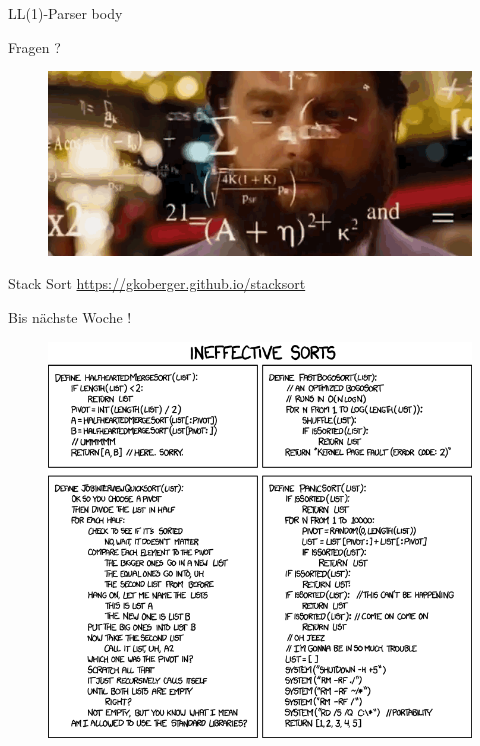 \documentclass[18pt]{beamer}
\begin{document}
\begin{frame}{LL(1)-Parser}
    body
\end{frame}

\appendix
\beginbackup

\begin{frame}{Fragen ?}
    \begin{figure}
        \includegraphics[scale=.5]{img/formulas.png}
    \end{figure}
\end{frame}

\begin{frame}{Stack Sort}
    \url{https://gkoberger.github.io/stacksort}
\end{frame}

\begin{frame}{Bis nächste Woche !}
    \begin{figure}
        \includegraphics[scale=.3]{img/ineffective_sorts.png}
    \end{figure}
\end{frame}

\backupend
\end{document}
